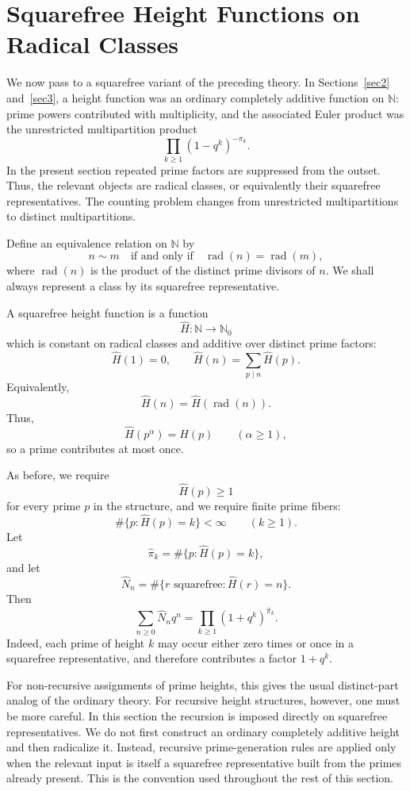 \documentclass[11pt]{article}
\theoremstyle{definition}
\begin{document}
\section{Squarefree Height Functions on Radical Classes}
\label{sec4}

We now pass to a squarefree variant of the preceding theory.  In
Sections~\ref{sec2} and~\ref{sec3}, a height function was an ordinary
completely additive function on \(\mathbb N\): prime powers contributed with
multiplicity, and the associated Euler product was the unrestricted
multipartition product
\[
  \prod_{k\ge1}(1-q^k)^{-\pi_k}.
\]
In the present section repeated prime factors are suppressed from the outset.
Thus, the relevant objects are radical classes, or equivalently their squarefree
representatives.  The counting problem changes from unrestricted
multipartitions to distinct multipartitions.

Define an equivalence relation on \(\mathbb N\) by
\[
  n\sim m
  \quad\text{if and only if}\quad
  \operatorname{rad}(n)=\operatorname{rad}(m),
\]
where \(\operatorname{rad}(n)\) is the product of the distinct prime divisors of
\(n\).  We shall always represent a class by its squarefree representative.

A squarefree height function is a function
\[
  \widehat H:\mathbb N\to\mathbb N_0
\]
which is constant on radical classes and additive over distinct prime factors:
\[
  \widehat H(1)=0,
  \qquad
  \widehat H(n)=\sum_{p\mid n}\widehat H(p).
\]
Equivalently,
\[
  \widehat H(n)=\widehat H(\operatorname{rad}(n)).
\]
Thus,
\[
  \widehat H(p^\alpha)=\widehat H(p)
  \qquad(\alpha\ge1),
\]
so a prime contributes at most once.

As before, we require
\[
  \widehat H(p)\ge1
\]
for every prime \(p\) in the structure, and we require finite prime fibers:
\[
  \#\{p:\widehat H(p)=k\}<\infty
  \qquad(k\ge1).
\]
Let
\[
  \widehat\pi_k=\#\{p:\widehat H(p)=k\},
\]
and let
\[
  \widehat N_n
  =
  \#\{r\text{ squarefree}:\widehat H(r)=n\}.
\]
Then
\[
  \sum_{n\ge0}\widehat N_nq^n
  =
  \prod_{k\ge1}(1+q^k)^{\widehat\pi_k}.
\]
Indeed, each prime of height \(k\) may occur either zero times or once in a
squarefree representative, and therefore contributes a factor \(1+q^k\).

For non-recursive assignments of prime heights, this gives the usual
distinct-part analog of the ordinary theory.  For recursive height
structures, however, one must be more careful.  In this section the recursion
is imposed directly on squarefree representatives.  We do not first construct
an ordinary completely additive height and then radicalize it.  Instead,
recursive prime-generation rules are applied only when the relevant input is
itself a squarefree representative built from the primes already present.  This
is the convention used throughout the rest of this section.
\end{document}
